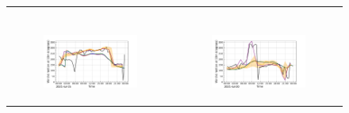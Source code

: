 \begin{figure}[hbtp]
\begin{tabular}{cc}
\begin{subfigure}[t]{0.5\textwidth}
        \end{subfigure} \\
        \begin{subfigure}[t]{0.5\textwidth}
            \caption{}
            \includegraphics[width=\textwidth]{images/chap6/IOP_TS/TS_2021-07-15_elsplans_wind_direction_10m.png}
        \end{subfigure} &
        \begin{subfigure}[t]{0.5\textwidth}
            \caption{}
            \includegraphics[width=\textwidth]{images/chap6/IOP_TS/TS_2021-07-20_elsplans_wind_direction_10m.png}
        \end{subfigure} \\
    \end{tabular}
    \caption{}
    \label{fig:iop_days_TS_surfvars_elsplans}
\end{figure}

